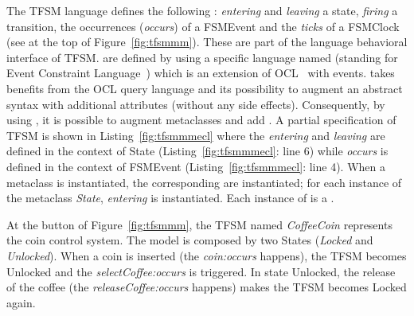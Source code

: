 The TFSM language defines the following \dse: \emph{entering} and \emph{leaving} a state, \emph{firing} a transition, the occurrences (\emph{occurs}) of a FSMEvent and the \emph{ticks} of a FSMClock (see at the top of Figure~\ref{fig:tfsmmm}). These \dse are part of the language behavioral interface of TFSM. \dse are defined by using a specific language named \ecl (standing for Event Constraint Language~\cite{eclbib}) which is an extension of OCL~\cite{omgocl2bib} with events. \ecl takes benefits from the OCL query language and its possibility to augment an abstract syntax with additional attributes (without any side effects). Consequently, by using \ecl, it is possible to augment \as metaclasses and add \dse. A partial \ecl specification of TFSM is shown in Listing~\ref{fig:tfsmmmecl} where the \dse \textit{entering} and \textit{leaving} are defined in the context of State (Listing~\ref{fig:tfsmmmecl}: line 6) while \textit{occurs} is defined in the context of FSMEvent (Listing~\ref{fig:tfsmmmecl}: line 4). When a metaclass is instantiated, the corresponding \dse are instantiated; \eg for each instance of the metaclass \emph{State}, \dse \textit{entering} is instantiated. Each instance of \dse is a \mse. 
	
At the button of Figure~\ref{fig:tfsmmm}, the TFSM named \emph{CoffeeCoin} represents the coin control system. The model is composed by two States (\emph{Locked} and \emph{Unlocked}). When a coin is inserted (the \mse \emph{coin:occurs} happens), the TFSM becomes Unlocked and the \mse \emph{selectCoffee:occurs} is triggered. In state Unlocked, the release of the coffee (the \mse \emph{releaseCoffee:occurs} happens) makes the TFSM becomes Locked again.   
	
